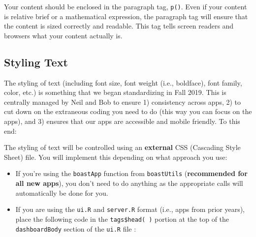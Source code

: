 \documentclass[]{book}
\newenvironment{Shaded}{\begin{snugshade}}{\end{snugshade}}
\newcommand{\CommentTok}[1]{\textcolor[rgb]{0.56,0.35,0.01}{\textit{#1}}}
\newcommand{\DataTypeTok}[1]{\textcolor[rgb]{0.13,0.29,0.53}{#1}}
\newcommand{\DecValTok}[1]{\textcolor[rgb]{0.00,0.00,0.81}{#1}}
\newcommand{\KeywordTok}[1]{\textcolor[rgb]{0.13,0.29,0.53}{\textbf{#1}}}
\newcommand{\NormalTok}[1]{#1}
\newcommand{\OperatorTok}[1]{\textcolor[rgb]{0.81,0.36,0.00}{\textbf{#1}}}
\newcommand{\StringTok}[1]{\textcolor[rgb]{0.31,0.60,0.02}{#1}}
\providecommand{\tightlist}{%
  \setlength{\itemsep}{0pt}\setlength{\parskip}{0pt}}
\begin{document}
Your content should be enclosed in the paragraph tag, \texttt{p()}. Even if your content is relative brief or a mathematical expression, the paragraph tag will ensure that the content is sized correctly and readable. This tag tells screen readers and browsers what your content actually is.

\hypertarget{textStyle}{%
\subsection{Styling Text}\label{textStyle}}

The styling of text (including font size, font weight (i.e., boldface), font family, color, etc.) is something that we began standardizing in Fall 2019. This is centrally managed by Neil and Bob to ensure 1) consistency across apps, 2) to cut down on the extraneous coding you need to do (this way you can focus on the apps), and 3) ensures that our apps are accessible and mobile friendly. To this end:

The styling of text will be controlled using an \textbf{external} CSS (Cascading Style Sheet) file. You will implement this depending on what approach you use:

\begin{itemize}
\tightlist
\item
  If you're using the \texttt{boastApp} function from \texttt{boastUtils} (\textbf{recommended for all new apps}), you don't need to do anything as the appropriate calls will automatically be done for you.
\item
  If you are using the \texttt{ui.R} and \texttt{server.R} format (i.e., apps from prior years), place the following code in the \texttt{tags\$head(\ )} portion at the top of the \texttt{dashboardBody} section of the \texttt{ui.R} file :
\end{itemize}

\begin{Shaded}
\end{Shaded}
\end{document}
